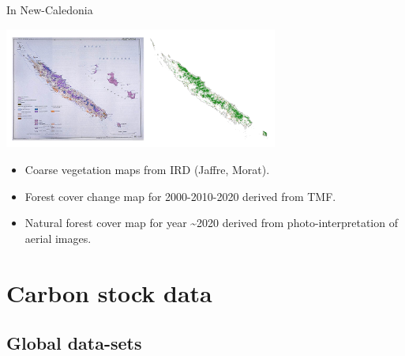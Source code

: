 \documentclass[10pt,table,dvipsnames,compress]{beamer}
\begin{document}
\begin{frame}[label={sec:orgb5e283c}]{In New-Caledonia}
\begin{center}
\includegraphics[width=9cm]{figs/fcc/fcc_nc.png}
\end{center}

\begin{itemize}
\item Coarse vegetation maps from IRD (Jaffre, Morat).
\item Forest cover change map for 2000-2010-2020 derived from TMF.
\item Natural forest cover map for year \textasciitilde{}2020 derived from photo-interpretation of aerial images.
\end{itemize}
\end{frame}

\section{Carbon stock data}
\label{sec:org4f33481}

\subsection{Global data-sets}
\label{sec:org35dc17f}
\end{document}
